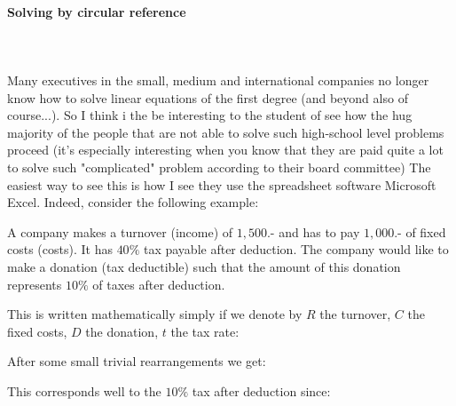 	\paragraph{Solving by circular reference}\mbox{}\\\\
	Many executives in the small, medium and international companies no longer know how to solve linear equations of the first degree (and beyond also of course...). So I think i the be interesting to the student of see how the hug majority of the people that are not able to solve such high-school level problems proceed (it's especially interesting when you know that they are paid quite a lot to solve such "complicated" problem according to their board committee) The easiest way to see this is how I see they use the spreadsheet software Microsoft Excel. Indeed, consider the following example:

	A company makes a turnover (income) of $1,500$.- and has to pay $1,000$.- of fixed costs (costs). It has $40\%$ tax payable after deduction. The company would like to make a donation (tax deductible) such that the amount of this donation represents $10\%$ of taxes after deduction.

	This is written mathematically simply if we denote by $R$ the turnover, $C$ the fixed costs, $D$ the donation, $t$ the tax rate:
	
	
	After some small trivial rearrangements we get:
	
	This corresponds well to the $10\%$ tax after deduction since:
	
